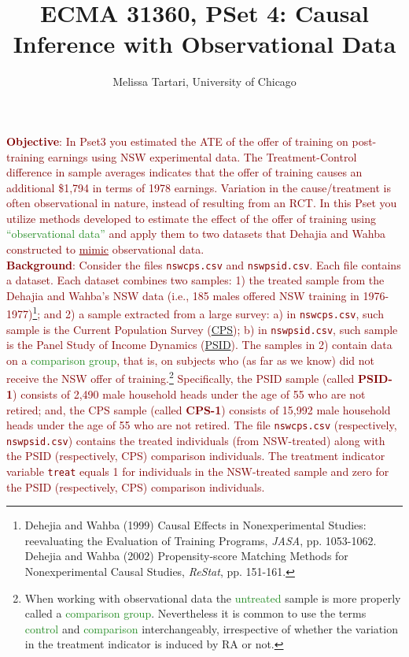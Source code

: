 \documentclass{article}
\newcommand{\psetnum}{4}
\begin{document}
\title{ECMA 31360, PSet \psetnum: Causal Inference with Observational Data}
\date{}
\author{Melissa Tartari, University of Chicago}
\maketitle
\thispagestyle{fancy}

\noindent \textcolor{Maroon}{\textbf{Objective}: In Pset3 you estimated the ATE of the offer of training on post-training earnings using NSW experimental data. The Treatment-Control difference in sample averages indicates that the offer of training causes an additional \$1,794 in terms of 1978 earnings. Variation in the cause/treatment is often observational in nature, instead of resulting from an RCT. In this Pset you utilize methods developed to estimate the effect of the offer of training using \textcolor{ForestGreen}{``observational data''} and apply them to two datasets that Dehajia and Wahba constructed to \underline{mimic} observational data.}\\

\noindent \textcolor{Maroon}{\textbf{Background}: Consider the files \texttt{nswcps.csv} and \texttt{nswpsid.csv}. Each file contains a dataset. Each dataset combines two samples: 1) the treated sample from the Dehajia and Wahba's NSW data (i.e., 185 males offered NSW training in 1976-1977)\footnote{Dehejia and Wahba (1999) Causal Effects in Nonexperimental Studies: reevaluating the Evaluation of Training Programs, \textit{JASA}, pp. 1053-1062. Dehejia and Wahba (2002) Propensity-score Matching Methods for Nonexperimental Causal Studies, \textit{ReStat}, pp. 151-161.}; and 2) a sample extracted from a large survey: a) in \texttt{nswcps.csv}, such sample is the Current Population Survey (\href{https://www.census.gov/cps/data/}{CPS}); b) in \texttt{nswpsid.csv}, such sample is the Panel Study of Income Dynamics (\href{https://psidonline.isr.umich.edu/}{PSID}). The samples in 2) contain data on a \textcolor{ForestGreen}{comparison group}, that is, on subjects who (as far as we know) did not receive the NSW offer of training.\footnote{When working with observational data the \textcolor{ForestGreen}{untreated} sample is more properly called a \textcolor{ForestGreen}{comparison group}. Nevertheless it is common to use the terms \textcolor{ForestGreen}{control} and \textcolor{ForestGreen}{comparison} interchangeably, irrespective of whether the variation in the treatment indicator is induced by RA or not.} Specifically, the PSID sample (called \textbf{PSID-1}) consists of 2,490 male household heads under the age of 55 who are not retired; and, the CPS sample (called \textbf{CPS-1}) consists of 15,992 male household heads under the age of 55 who are not retired. The file \texttt{nswcps.csv} (respectively, \texttt{nswpsid.csv}) contains the treated individuals (from NSW-treated) along with the PSID (respectively, CPS) comparison individuals. The treatment indicator variable \texttt{treat} equals 1 for individuals in the NSW-treated sample and zero for the PSID (respectively, CPS) comparison individuals.}  
\end{document}
